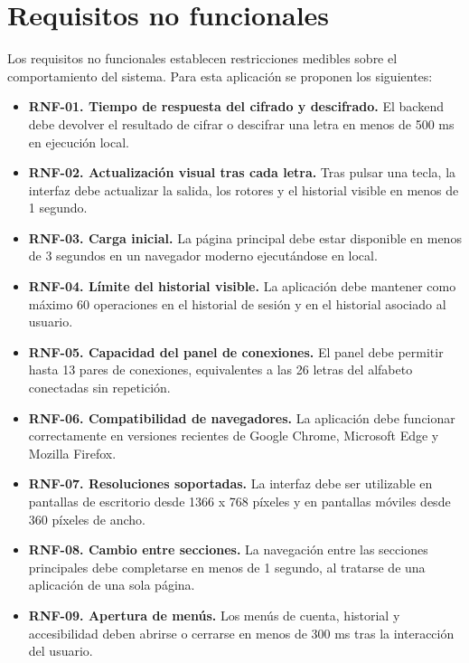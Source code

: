 \section{Requisitos no funcionales}

Los requisitos no funcionales establecen restricciones medibles sobre el comportamiento del sistema. Para esta aplicación se proponen los siguientes:

\begin{itemize}
	\item \textbf{RNF-01. Tiempo de respuesta del cifrado y descifrado.} El backend debe devolver el resultado de cifrar o descifrar una letra en menos de 500 ms en ejecución local.
	
	\item \textbf{RNF-02. Actualización visual tras cada letra.} Tras pulsar una tecla, la interfaz debe actualizar la salida, los rotores y el historial visible en menos de 1 segundo.
	
	\item \textbf{RNF-03. Carga inicial.} La página principal debe estar disponible en menos de 3 segundos en un navegador moderno ejecutándose en local.
	
	\item \textbf{RNF-04. Límite del historial visible.} La aplicación debe mantener como máximo 60 operaciones en el historial de sesión y en el historial asociado al usuario.
	
	\item \textbf{RNF-05. Capacidad del panel de conexiones.} El panel debe permitir hasta 13 pares de conexiones, equivalentes a las 26 letras del alfabeto conectadas sin repetición.
	
	\item \textbf{RNF-06. Compatibilidad de navegadores.} La aplicación debe funcionar correctamente en versiones recientes de Google Chrome, Microsoft Edge y Mozilla Firefox.
	
	\item \textbf{RNF-07. Resoluciones soportadas.} La interfaz debe ser utilizable en pantallas de escritorio desde 1366 x 768 píxeles y en pantallas móviles desde 360 píxeles de ancho.
	
	\item \textbf{RNF-08. Cambio entre secciones.} La navegación entre las secciones principales debe completarse en menos de 1 segundo, al tratarse de una aplicación de una sola página.
	
	\item \textbf{RNF-09. Apertura de menús.} Los menús de cuenta, historial y accesibilidad deben abrirse o cerrarse en menos de 300 ms tras la interacción del usuario.
	

\end{itemize}
